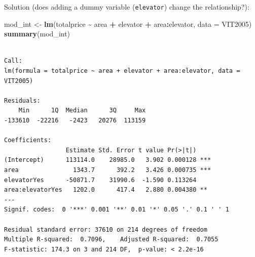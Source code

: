 \documentclass[
  ignorenonframetext,
]{beamer}
\newenvironment{Shaded}{\begin{snugshade}}{\end{snugshade}}
\newcommand{\AttributeTok}[1]{\textcolor[rgb]{0.13,0.29,0.53}{#1}}
\newcommand{\FunctionTok}[1]{\textcolor[rgb]{0.13,0.29,0.53}{\textbf{#1}}}
\newcommand{\NormalTok}[1]{#1}
\newcommand{\OtherTok}[1]{\textcolor[rgb]{0.56,0.35,0.01}{#1}}
\newcommand{\SpecialCharTok}[1]{\textcolor[rgb]{0.81,0.36,0.00}{\textbf{#1}}}
\begin{document}
\begin{frame}[fragile]{Solution (does adding a dummy variable
(\texttt{elevator}) change the relationship?):}
\label{solution-does-adding-a-dummy-variable-elevator-change-the-relationship-1}
\scriptsize

\begin{Shaded}
\begin{Highlighting}[]
\NormalTok{mod\_int }\OtherTok{\textless{}{-}} \FunctionTok{lm}\NormalTok{(totalprice }\SpecialCharTok{\textasciitilde{}}\NormalTok{ area }\SpecialCharTok{+}\NormalTok{ elevator }\SpecialCharTok{+}\NormalTok{ area}\SpecialCharTok{:}\NormalTok{elevator, }\AttributeTok{data =}\NormalTok{ VIT2005)}
\FunctionTok{summary}\NormalTok{(mod\_int)}
\end{Highlighting}
\end{Shaded}

\begin{verbatim}

Call:
lm(formula = totalprice ~ area + elevator + area:elevator, data = VIT2005)

Residuals:
    Min      1Q  Median      3Q     Max 
-133610  -22216   -2423   20276  113159 

Coefficients:
                 Estimate Std. Error t value Pr(>|t|)    
(Intercept)      113114.0    28985.0   3.902 0.000128 ***
area               1343.7      392.2   3.426 0.000735 ***
elevatorYes      -50871.7    31990.6  -1.590 0.113264    
area:elevatorYes   1202.0      417.4   2.880 0.004380 ** 
---
Signif. codes:  0 '***' 0.001 '**' 0.01 '*' 0.05 '.' 0.1 ' ' 1

Residual standard error: 37610 on 214 degrees of freedom
Multiple R-squared:  0.7096,    Adjusted R-squared:  0.7055 
F-statistic: 174.3 on 3 and 214 DF,  p-value: < 2.2e-16
\end{verbatim}

\normalsize
\end{frame}
\end{document}
